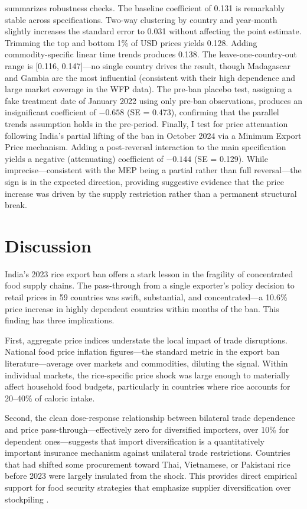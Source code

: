\documentclass[12pt]{article}
\begin{document}
 summarizes robustness checks. The baseline coefficient of 0.131 is remarkably stable across specifications. Two-way clustering by country and year-month slightly increases the standard error to 0.031 without affecting the point estimate. Trimming the top and bottom 1\% of USD prices yields 0.128. Adding commodity-specific linear time trends produces 0.138. The leave-one-country-out range is [0.116, 0.147]---no single country drives the result, though Madagascar and Gambia are the most influential (consistent with their high dependence and large market coverage in the WFP data). The pre-ban placebo test, assigning a fake treatment date of January 2022 using only pre-ban observations, produces an insignificant coefficient of $-0.658$ (SE = 0.473), confirming that the parallel trends assumption holds in the pre-period. Finally, I test for price attenuation following India's partial lifting of the ban in October 2024 via a Minimum Export Price mechanism. Adding a post-reversal interaction to the main specification yields a negative (attenuating) coefficient of $-0.144$ (SE = 0.129). While imprecise---consistent with the MEP being a partial rather than full reversal---the sign is in the expected direction, providing suggestive evidence that the price increase was driven by the supply restriction rather than a permanent structural break.




\section{Discussion}

India's 2023 rice export ban offers a stark lesson in the fragility of concentrated food supply chains. The pass-through from a single exporter's policy decision to retail prices in 59 countries was swift, substantial, and concentrated---a 10.6\% price increase in highly dependent countries within months of the ban. This finding has three implications.

First, aggregate price indices understate the local impact of trade disruptions. National food price inflation figures---the standard metric in the export ban literature---average over markets and commodities, diluting the signal. Within individual markets, the rice-specific price shock was large enough to materially affect household food budgets, particularly in countries where rice accounts for 20--40\% of caloric intake.

Second, the clean dose-response relationship between bilateral trade dependence and price pass-through---effectively zero for diversified importers, over 10\% for dependent ones---suggests that import diversification is a quantitatively important insurance mechanism against unilateral trade restrictions. Countries that had shifted some procurement toward Thai, Vietnamese, or Pakistani rice before 2023 were largely insulated from the shock. This provides direct empirical support for food security strategies that emphasize supplier diversification over stockpiling \citep{gotz2020russia, laborde2021covid}.
\end{document}
